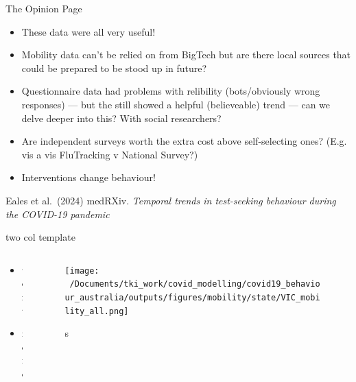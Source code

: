 \documentclass[
  ignorenonframetext,
  aspectratio=149,
]{beamer}
\providecommand{\tightlist}{%
  \setlength{\itemsep}{0pt}\setlength{\parskip}{0pt}}\usepackage{longtable,booktabs,array}
\begin{document}
\begin{frame}{The Opinion Page}
\label{the-opinion-page}
\begin{itemize}
\tightlist
\item
  These data were all very useful!
\item
  Mobility data can't be relied on from BigTech but are there local
  sources that could be prepared to be stood up in future?
\item
  Questionnaire data had problems with relibility (bots/obviously wrong
  responses) --- but the still showed a helpful (believeable) trend ---
  can we delve deeper into this? With social researchers?
\item
  Are independent surveys worth the extra cost above self-selecting
  ones? (E.g. vis a vis FluTracking v National Survey?)
\item
  Interventions change behaviour!
\end{itemize}

Eales et al.~(2024) medRXiv. \emph{Temporal trends in test-seeking
behaviour during the COVID-19 pandemic}
\end{frame}

\begin{frame}{two col template}
\label{two-col-template}
\begin{columns}[T]
\begin{column}{0.6\textwidth}
\begin{itemize}
\tightlist
\item
  text
\item
  more
\end{itemize}
\end{column}

\begin{column}{0.4\textwidth}
\begin{figure}[H]

{\centering \texttt{[image: ~/Documents/tki\_work/covid\_modelling/covid19\_behaviour\_australia/outputs/figures/mobility/state/VIC\_mobility\_all.png]}

}

\caption{s}

\end{figure}%
\end{column}
\end{columns}
\end{frame}
\end{document}
